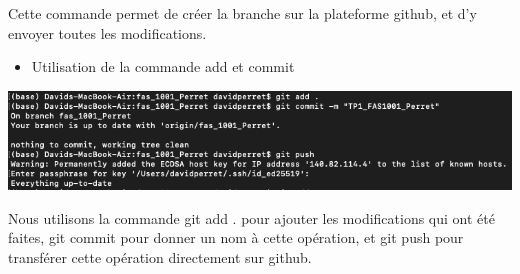 \documentclass[
  letterpaper,
  DIV=11,
  numbers=noendperiod]{scrartcl}
\providecommand{\tightlist}{%
  \setlength{\itemsep}{0pt}\setlength{\parskip}{0pt}}\usepackage{longtable,booktabs,array}
\begin{document}
Cette commande permet de créer la branche sur la plateforme github, et
d'y envoyer toutes les modifications.

\begin{itemize}
\tightlist
\item
  Utilisation de la commande add et commit
\end{itemize}

\includegraphics{images/screen add.png}

Nous utilisons la commande git add . pour ajouter les modifications qui
ont été faites, git commit pour donner un nom à cette opération, et git
push pour transférer cette opération directement sur github.
\end{document}
